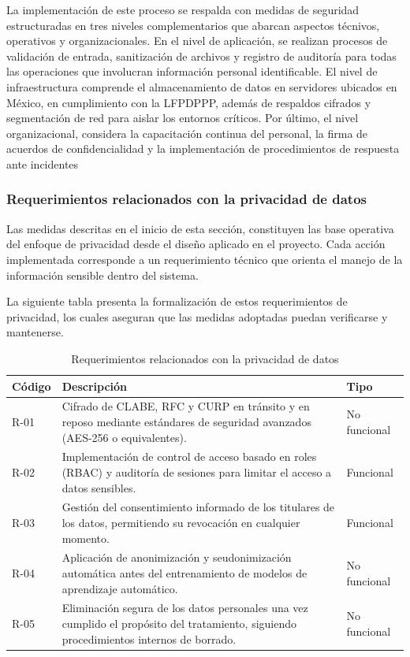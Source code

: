 La implementación de este proceso se respalda con medidas de seguridad estructuradas en tres niveles complementarios que abarcan aspectos técnivos, operativos y organizacionales. En el nivel de aplicación, se realizan procesos de validación de entrada, sanitización de archivos y registro de auditoría para todas las operaciones que involucran información personal identificable.
El nivel de infraestructura comprende el almacenamiento de datos en servidores ubicados en México, en cumplimiento con la LFPDPPP, además de respaldos cifrados y segmentación de red para aislar los entornos críticos. 
Por último, el nivel organizacional, considera la capacitación continua del personal, la firma de acuerdos de confidencialidad y la implementación de procedimientos de respuesta ante incidentes


\subsubsection{Requerimientos relacionados con la privacidad de datos}

Las medidas descritas en el inicio de esta sección, constituyen las base operativa del enfoque de privacidad desde el diseño aplicado en el proyecto. Cada acción implementada corresponde a un requerimiento técnico que orienta el manejo de la información sensible dentro del sistema.

La siguiente tabla presenta la formalización de estos requerimientos de privacidad, los cuales aseguran que las medidas adoptadas puedan verificarse y mantenerse.

\begin{table}[H]
    \centering
    \caption{Requerimientos relacionados con la privacidad de datos}
    \label{tab:requerimientos_privacidad}
    \scriptsize
    \begin{tabular}{|p{1.2cm}|p{6cm}|p{3cm}|}
    \hline
    \textbf{Código} & \textbf{Descripción} & \textbf{Tipo} \\ \hline
    R-01 & Cifrado de CLABE, RFC y CURP en tránsito y en reposo mediante estándares de seguridad avanzados (AES-256 o equivalentes). & No funcional \\ \hline
    R-02 & Implementación de control de acceso basado en roles (RBAC) y auditoría de sesiones para limitar el acceso a datos sensibles. & Funcional \\ \hline
    R-03 & Gestión del consentimiento informado de los titulares de los datos, permitiendo su revocación en cualquier momento. & Funcional \\ \hline
    R-04 & Aplicación de anonimización y seudonimización automática antes del entrenamiento de modelos de aprendizaje automático. & No funcional \\ \hline
    R-05 & Eliminación segura de los datos personales una vez cumplido el propósito del tratamiento, siguiendo procedimientos internos de borrado. & No funcional \\ \hline
    \end{tabular}
\end{table}


